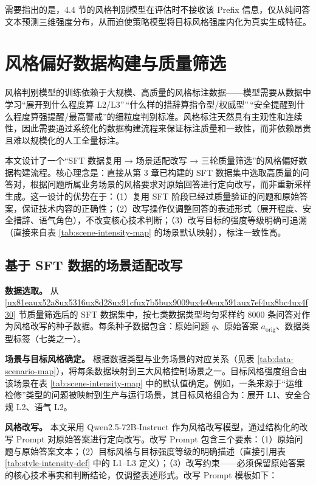 \documentclass[fontset=fandol,type=master,campus=shenzhen,etitleauto=true]{hithesisbook}
\begin{document}
需要指出的是，4.4 节的风格判别模型在评估时不接收该 Prefix 信息，仅从纯问答文本预测三维强度分布，从而迫使策略模型将目标风格强度内化为真实生成特征。

\section{风格偏好数据构建与质量筛选}\label{ux98ceux683cux504fux597dux6570ux636eux6784ux5efaux4e0e-llm-as-judge-ux7b5bux9009}

风格判别模型的训练依赖于大规模、高质量的风格标注数据------模型需要从数据中学习``展开到什么程度算 L2/L3''\,``什么样的措辞算指令型/权威型''\,``安全提醒到什么程度算强提醒/最高警戒''的细粒度判别标准。风格标注天然具有主观性和连续性，因此需要通过系统化的数据构建流程来保证标注质量和一致性，而非依赖昂贵且难以规模化的人工全量标注。

本文设计了一个``SFT 数据复用 → 场景适配改写 → 三轮质量筛选''的风格偏好数据构建流程。核心理念是：直接从第 3 章已构建的 SFT 数据集中选取高质量的问答对，根据问题所属业务场景的风格要求对原始回答进行定向改写，而非重新采样生成。这一设计的优势在于：（1）复用 SFT 阶段已经过质量验证的问题和原始答案，保证技术内容的正确性；（2）改写操作仅调整回答的表述形式（展开程度、安全措辞、语气角色），不改变核心技术判断；（3）改写目标的强度等级明确可追溯（直接来自表 \ref{tab:scene-intensity-map} 的场景默认映射），标注一致性高。

\subsection{基于 SFT 数据的场景适配改写}\label{ux57faux4e8e-sft-ux6570ux636eux7684ux573aux666fux9002ux914dux6539ux5199}

\textbf{数据选取。} 从 \ref{ux81eaux52a8ux5316ux8d28ux91cfux7b5bux9009ux4e0eux591aux7ef4ux8bc4ux4f30} 节质量筛选后的 SFT 数据集中，按七类数据类型均匀采样约 8000 条问答对作为风格改写的种子数据。每条种子数据包含：原始问题 $q$、原始答案 $a_{\text{orig}}$、数据类型标签（七类之一）。

\textbf{场景与目标风格确定。} 根据数据类型与业务场景的对应关系（见表 \ref{tab:data-scenario-map}），将每条数据映射到三大风格控制场景之一。目标风格强度组合由该场景在表 \ref{tab:scene-intensity-map} 中的默认值确定。例如，一条来源于``运维检修''类型的问题被映射到生产与运行场景，其目标风格组合为：展开 L1、安全合规 L2、语气 L2。

\textbf{风格改写。} 本文采用 Qwen2.5-72B-Instruct 作为风格改写模型，通过结构化的改写 Prompt 对原始答案进行定向改写。改写 Prompt 包含三个要素：（1）原始问题与原始答案文本；（2）目标风格与目标强度等级的明确描述（直接引用表 \ref{tab:style-intensity-def} 中的 L1--L3 定义）；（3）改写约束------必须保留原始答案的核心技术事实和判断结论，仅调整表述形式。改写 Prompt 模板如下：
\end{document}

